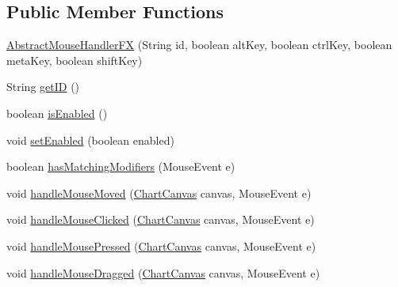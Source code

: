 \subsection*{Public Member Functions}
\begin{DoxyCompactItemize}
\item 
\mbox{\hyperlink{classorg_1_1jfree_1_1chart_1_1fx_1_1interaction_1_1_abstract_mouse_handler_f_x_a7cee61adb872c016acf112972d053e71}{Abstract\+Mouse\+Handler\+FX}} (String id, boolean alt\+Key, boolean ctrl\+Key, boolean meta\+Key, boolean shift\+Key)
\item 
String \mbox{\hyperlink{classorg_1_1jfree_1_1chart_1_1fx_1_1interaction_1_1_abstract_mouse_handler_f_x_afb58abefdfef15a11ecdbb0fa72e4757}{get\+ID}} ()
\item 
boolean \mbox{\hyperlink{classorg_1_1jfree_1_1chart_1_1fx_1_1interaction_1_1_abstract_mouse_handler_f_x_a231b7ea733036ba44a5c610184f5b1b0}{is\+Enabled}} ()
\item 
void \mbox{\hyperlink{classorg_1_1jfree_1_1chart_1_1fx_1_1interaction_1_1_abstract_mouse_handler_f_x_ab6470d66d80656f13b722269a736f752}{set\+Enabled}} (boolean enabled)
\item 
boolean \mbox{\hyperlink{classorg_1_1jfree_1_1chart_1_1fx_1_1interaction_1_1_abstract_mouse_handler_f_x_a9fe0aad14036619a388d6894d19c3f0a}{has\+Matching\+Modifiers}} (Mouse\+Event e)
\item 
void \mbox{\hyperlink{classorg_1_1jfree_1_1chart_1_1fx_1_1interaction_1_1_abstract_mouse_handler_f_x_a230992718e2106e928c8ea454d0d6a06}{handle\+Mouse\+Moved}} (\mbox{\hyperlink{classorg_1_1jfree_1_1chart_1_1fx_1_1_chart_canvas}{Chart\+Canvas}} canvas, Mouse\+Event e)
\item 
void \mbox{\hyperlink{classorg_1_1jfree_1_1chart_1_1fx_1_1interaction_1_1_abstract_mouse_handler_f_x_a844c908ba8528b4f0a1afb139fd9cd36}{handle\+Mouse\+Clicked}} (\mbox{\hyperlink{classorg_1_1jfree_1_1chart_1_1fx_1_1_chart_canvas}{Chart\+Canvas}} canvas, Mouse\+Event e)
\item 
void \mbox{\hyperlink{classorg_1_1jfree_1_1chart_1_1fx_1_1interaction_1_1_abstract_mouse_handler_f_x_a3e8a17fbf7481ed55e99759ab96746ef}{handle\+Mouse\+Pressed}} (\mbox{\hyperlink{classorg_1_1jfree_1_1chart_1_1fx_1_1_chart_canvas}{Chart\+Canvas}} canvas, Mouse\+Event e)
\item 
void \mbox{\hyperlink{classorg_1_1jfree_1_1chart_1_1fx_1_1interaction_1_1_abstract_mouse_handler_f_x_a467c9af78e00bda4799b151328d84c9e}{handle\+Mouse\+Dragged}} (\mbox{\hyperlink{classorg_1_1jfree_1_1chart_1_1fx_1_1_chart_canvas}{Chart\+Canvas}} canvas, Mouse\+Event e)

\end{DoxyCompactItemize}
